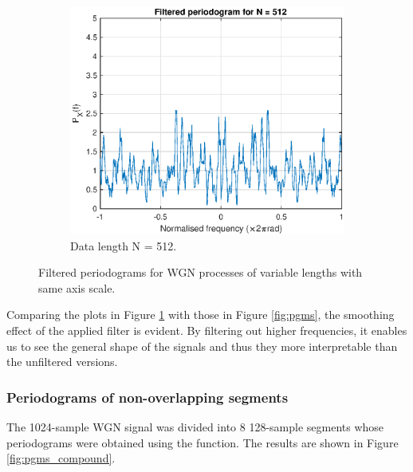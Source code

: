 \begin{figure}[H]
\begin{subfigure}{.32\textwidth}
  \centering
  \includegraphics[width=\linewidth]{assignment3figs/pgm_filt512.eps}  
  \caption{Data length N = 512.}
\end{subfigure}
\caption{Filtered periodograms for WGN processes of variable lengths with same axis scale.}
\label{fig:pgms_filt}
\end{figure}

\noindent
Comparing the plots in Figure \ref{fig:pgms_filt} with those in Figure \ref{fig:pgms}, the smoothing effect of the applied filter is evident. By filtering out higher frequencies, it enables us to see the general shape of the signals and thus they more interpretable than the unfiltered versions.


\subsubsection{Periodograms of non-overlapping segments}

The 1024-sample WGN signal was divided into 8 128-sample segments whose periodograms were obtained using the  function. The results are shown in Figure \ref{fig:pgms_compound}.

